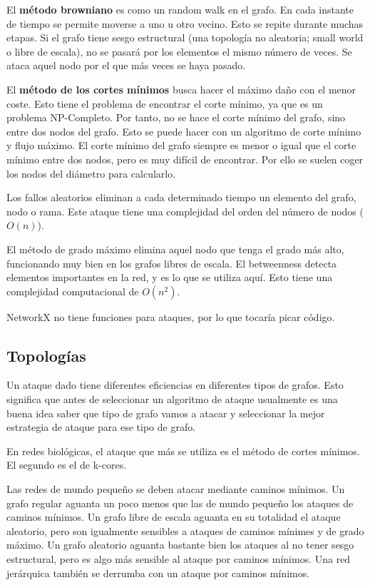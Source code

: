 El \textbf{método browniano} es como un random walk en el grafo. En cada instante de tiempo se permite moverse a uno u otro vecino. Esto se repite durante muchas etapas. Si el grafo tiene sesgo estructural (una topología no aleatoria; small world o libre de escala), no se pasará por los elementos el mismo número de veces. Se ataca aquel nodo por el que más veces se haya pasado. 

El \textbf{método de los cortes mínimos} busca hacer el máximo daño con el menor coste. Esto tiene el problema de encontrar el corte mínimo, ya que es un problema NP-Completo. Por tanto, no se hace el corte mínimo del grafo, sino entre dos nodos del grafo. Esto se puede hacer con un algoritmo de corte mínimo y flujo máximo. El corte mínimo del grafo siempre es menor o igual que el corte mínimo entre dos nodos, pero es muy difícil de encontrar. Por ello se suelen coger los nodos del diámetro para calcularlo.

Los fallos aleatorios eliminan a cada determinado tiempo un elemento del grafo, nodo o rama. Este ataque tiene una complejidad del orden del número de nodos ($O(n)$). 

El método de grado máximo elimina aquel nodo que tenga el grado más alto, funcionando muy bien en los grafos libres de escala. El betweenness detecta elementos importantes en la red, y es lo que se utiliza aquí. Esto tiene una complejidad computacional de $O(n^2)$.

NetworkX no tiene funciones para ataques, por lo que tocaría picar código.

\subsection{Topologías}
Un ataque dado tiene diferentes eficiencias en diferentes tipos de grafos. Esto significa que antes de seleccionar un algoritmo de ataque usualmente es una buena idea saber que tipo de grafo vamos a atacar y seleccionar la mejor estrategia de ataque para ese tipo de grafo.

En redes biológicas, el ataque que más se utiliza es el método de cortes mínimos. El segundo es el de k-cores.

Las redes de mundo pequeño se deben atacar mediante caminos mínimos. Un grafo regular aguanta un poco menos que las de mundo pequeño los ataques de caminos mínimos. Un grafo libre de escala aguanta en su totalidad el ataque aleatorio, pero son igualmente sensibles a ataques de caminos mínimes y de grado máximo. Un grafo aleatorio aguanta bastante bien los ataques al no tener sesgo estructural, pero es algo más sensible al ataque por caminos mínimos. Una red jerárquica también se derrumba con un ataque por caminos mínimos.

